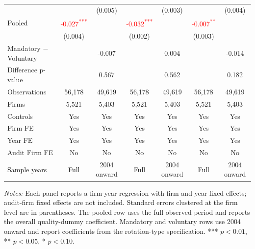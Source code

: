 \documentclass[10pt]{article}
\newcommand{\sym}[1]{\textsuperscript{#1}}
\begin{document}
\begin{minipage}{19cm}
\begin{threeparttable}
\begin{tabular}{l cc cc cc}
 &  & (0.005) &  & (0.003) &  & (0.004) \\
Pooled & \textcolor{red}{-0.027\sym{***}} &  & \textcolor{red}{-0.032\sym{***}} &  & \textcolor{red}{-0.007\sym{**}} &  \\
 & (0.004) &  & (0.002) &  & (0.003) &  \\
Mandatory $-$ Voluntary &  & -0.007 &  & 0.004 &  & -0.014 \\
Difference p-value &  & 0.567 &  & 0.562 &  & 0.182 \\
Observations & 56,178 & 49,619 & 56,178 & 49,619 & 56,178 & 49,619 \\
Firms & 5,521 & 5,403 & 5,521 & 5,403 & 5,521 & 5,403 \\
\midrule
Controls & Yes & Yes & Yes & Yes & Yes & Yes \\
Firm FE & Yes & Yes & Yes & Yes & Yes & Yes \\
Year FE & Yes & Yes & Yes & Yes & Yes & Yes \\
Audit Firm FE & No & No & No & No & No & No \\
Sample years & Full & 2004 onward & Full & 2004 onward & Full & 2004 onward \\
\bottomrule
\end{tabular}
\begin{tablenotes}\fontsize{9}{11}\selectfont
\item \fontsize{9}{11}\selectfont \textit{Notes:} Each panel reports a firm-year regression with firm and year fixed effects; audit-firm fixed effects are not included. Standard errors clustered at the firm level are in parentheses. The pooled row uses the full observed period and reports the overall quality-dummy coefficient. Mandatory and voluntary rows use 2004 onward and report coefficients from the rotation-type specification. *** \(p<0.01\), ** \(p<0.05\), * \(p<0.10\).
\end{tablenotes}
\end{threeparttable}

\end{minipage}
\end{document}
